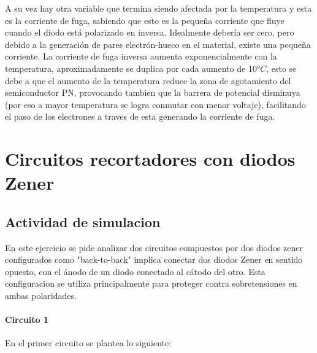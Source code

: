 \documentclass[chaptersright]{informeutn}
\begin{document}
        A su vez hay otra variable que termina siendo afectada por la temperatura y esta es la corriente de fuga,
        sabiendo que esto es la pequeña corriente que fluye cuando el diodo está polarizado en inversa. Idealmente 
        debería ser cero, pero debido a la generación de pares electrón-hueco en el material, existe una pequeña 
        corriente. La corriente de fuga inversa aumenta exponencialmente con la temperatura, aproximadamente se 
        duplica por cada aumento de 10$°C$, esto se debe a que el aumento de la temperatura reduce la zona de 
        agotamiento del semiconductor PN, provocando tambien que la barrera de potencial disminuya (por eso a mayor 
        temperatura se logra conmutar con menor voltaje), facilitando el paso de los electrones a traves de esta 
        generando la corriente de fuga.


        

  
  \part{Circuitos recortadores con diodos Zener}
    \chapter{Actividad de simulacion}
        En este ejercicio se pide analizar dos circuitos compuestos por dos diodos zener configurados como "back-to-back" implica conectar dos diodos Zener en sentido opuesto, con el ánodo de un diodo conectado al cátodo del otro. Esta configuracion se utiliza principalmente para proteger contra sobretensiones en ambas polaridades.
        
        \subsection{Circuito 1}

            En el primer circuito  se plantea lo siguiente:
    
\end{document}
